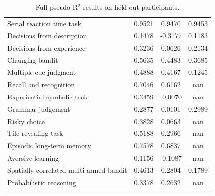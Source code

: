 \documentclass[pdflatex,sn-nature]{sn-jnl}%
\theoremstyle{thmstyleone}%
\theoremstyle{thmstyletwo}%
\theoremstyle{thmstylethree}%
\begin{document}
\begin{table}[h]
\begin{tabular}{@{}lccc@{}}
Serial reaction time task & 0.9521 & 0.9470 & 0.9453 \\ 
Decisions from description & 0.1478 & -0.3177 & 0.1183 \\ 
Decisions from experience & 0.3236 & 0.0626 & 0.2134 \\ 
Changing bandit & 0.5635 & 0.4483 & 0.3685 \\ 
Multiple-cue judgment & 0.4888 & 0.4167 & 0.1245 \\ 
Recall and recognition & 0.7046 & 0.6162 & nan \\ 
Experiential-symbolic task & 0.3459 & -0.0070 & nan \\ 
Grammar judgement & 0.2877 & 0.0101 & 0.2989 \\ 
Risky choice & 0.3828 & 0.0663 & nan \\ 
Tile-revealing task & 0.5188 & 0.2966 & nan \\ 
Episodic long-term memory & 0.7578 & 0.6837 & nan \\ 
Aversive learning & 0.1156 & -0.1087 & nan \\ 
Spatially correlated multi-armed bandit & 0.4613 & 0.2804 & 0.1789 \\ 
Probabilistic reasoning & 0.3378 & 0.2632 & nan \\ 
\bottomrule \\ 
\end{tabular} 
\caption{Full pseudo-R$^2$ results on held-out participants.}
\label{tab:tab3} 
\end{table}
\end{document}

